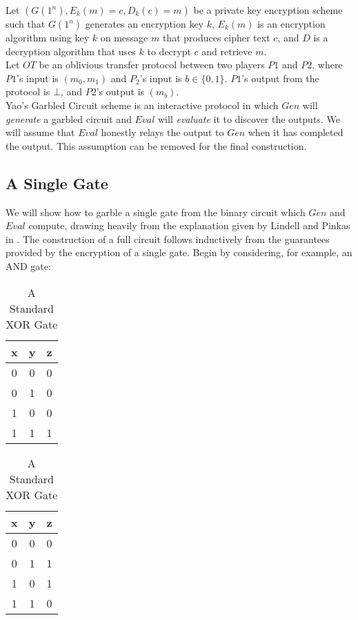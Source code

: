 \documentclass{article}
\begin{document}
Let $(G(1^n),E_{k}(m) = c ,D_k(c) = m)$ be a private key encryption scheme such that $G(1^n)$ generates an encryption key $k$, $E_k(m)$ is an encryption algorithm using key $k$ on message $m$ that produces cipher text $c$, and $D$ is a decryption algorithm that uses $k$ to decrypt $c$ and retrieve $m$. \\

Let $OT$ be an oblivious transfer protocol between two players $P1$ and $P2$, where $P1$'s input is $(m_0,m_1)$ and $P_2$'s input is $b \in \{0,1\}$. $P1$'s output from the protocol is $\bot$, and $P2$'s output is $(m_b)$. \\

Yao's Garbled Circuit scheme is an interactive protocol in which $Gen$ will \textit{generate} a garbled circuit and $Eval$ will \textit{evaluate} it to discover the outputs. We will assume that $Eval$ honestly relays the output to $Gen$ when it has completed the output. This assumption can be removed for the final construction.

\subsection{A Single Gate}

We will show how to garble a single gate from the binary circuit which $Gen$ and $Eval$ compute, drawing heavily from the explanation given by Lindell and Pinkas in \cite{yaoproof}. The construction of a full circuit follows inductively from the guarantees provided by the encryption of a single gate. Begin by considering, for example, an AND gate:

\begin{table}[h]
\begin{minipage}{.5\linewidth}
\centering
\begin{tabular}{c c | c}
	x & y & z \\ \hline
	0 & 0 & 0 \\
	0 & 1 & 0 \\
	1 & 0 & 0 \\
	1 & 1 & 1 \\
\end{tabular}
\caption{A Standard AND Gate}
\label{standard-and-gate}
\end{minipage}%
\begin{minipage}{.5\linewidth}
\centering
\begin{tabular}{c c | c}
	x & y & z \\ \hline
	0 & 0 & 0 \\
	0 & 1 & 1 \\
	1 & 0 & 1 \\
	1 & 1 & 0 \\
\end{tabular}
\label{standard-xor-gate}
\caption{A Standard XOR Gate}
\end{minipage}%
\end{table}
\end{document}
